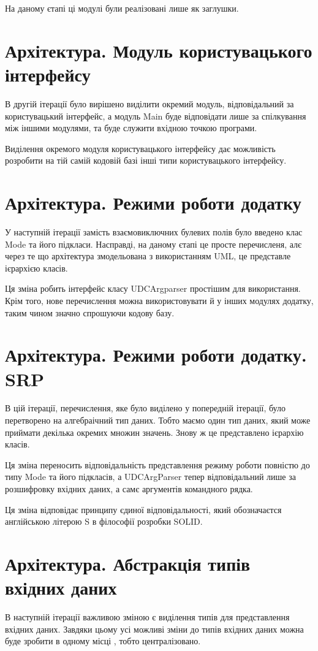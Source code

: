 \documentclass{article}
\let\oldsection\section
\renewcommand{\section}{\clearpage\oldsection}
\begin{document}
На даному єтапі ці модулі були реалізовані лише як заглушки.

\section{Архітектура. Модуль користувацького інтерфейсу}
В другій ітерації було вирішено виділити окремий модуль, відповідальний за користувацький інтерфейс,
а модуль Main буде відповідати лише за спілкування між іншими модулями,
та буде служити вхідною точкою програми.

Виділення окремого модуля користувацького інтерфейсу
дає можливість розробити на тій самій кодовій базі інші типи користувацького інтерфейсу. 

\section{Архітектура. Режими роботи додатку}
У наступній ітерації замість взаємовиключних булевих полів було введено клас Mode
та його підкласи. Насправді, на даному єтапі це просте перечисленя,
алє через те що архітектура змодельована з використанням UML, це представле ієрархією класів.

Ця зміна робить інтерфейс класу UDCArgparser простішим для використання.
Крім того, нове перечислення можна використовувати й у інших модулях додатку,
таким чином значно спрошуючи кодову базу.

\section{Архітектура. Режими роботи додатку. SRP}
В цій ітерації, перечислення, яке було виділено у попередній ітерації,
було перетворено на алгебраічний тип даних. Тобто маємо один тип даних,
який може приймати декілька окремих множин значень. Знову ж це представлено ієрархію класів.

Ця зміна переносить відповідальність представлення режиму роботи повністю
до типу Mode та його підкласів, а UDCArgParser тепер відповідальний лише за
розшифровку вхідних даних, а самє аргументів командного рядка.

Ця зміна відповідає принципу єдиної відповідальності,
який обозначаєтся англійською літерою S в філософії розробки SOLID.

\section{Архітектура. Абстракція типів вхідних даних}
В наступній ітерації важливою зміною є виділення типів для представлення вхідних даних.
Завдяки цьому усі можливі зміни до типів вхідних даних можна буде зробити в одному місці
, тобто централізовано.
\end{document}
